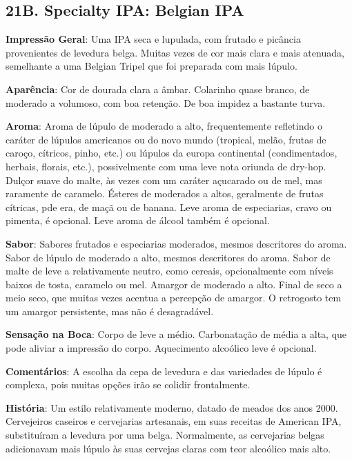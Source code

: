\subsection*{21B. Specialty IPA: Belgian IPA}

\textbf{Impressão Geral}: Uma IPA seca e lupulada, com frutado e picância provenientes de levedura belga. Muitas vezes de cor mais clara e mais atenuada, semelhante a uma Belgian Tripel que foi preparada com mais lúpulo.

\textbf{Aparência}: Cor de dourada clara a âmbar. Colarinho quase branco, de moderado a volumoso, com boa retenção. De boa impidez a bastante turva.

\textbf{Aroma}: Aroma de lúpulo de moderado a alto, frequentemente refletindo o caráter de lúpulos americanos ou do novo mundo (tropical, melão, frutas de caroço, cítricos, pinho, etc.) ou lúpulos da europa continental (condimentados, herbais, florais, etc.), possivelmente com uma leve nota oriunda de dry-hop. Dulçor suave do malte, às vezes com um caráter açucarado ou de mel, mas raramente de caramelo. Ésteres de moderados a altos, geralmente de frutas cítricas, pde era, de maçã ou de banana. Leve aroma de especiarias, cravo ou pimenta, é opcional. Leve aroma de álcool também é opcional.

\textbf{Sabor}: Sabores frutados e especiarias moderados, mesmos descritores do aroma. Sabor de lúpulo de moderado a alto, mesmos descritores do aroma. Sabor de malte de leve a relativamente neutro, como cereais, opcionalmente com níveis baixos de tosta, caramelo ou mel. Amargor de moderado a alto. Final de seco a meio seco, que muitas vezes acentua a percepção de amargor. O retrogosto tem um amargor persistente, mas não é desagradável.

\textbf{Sensação na Boca}: Corpo de leve a médio. Carbonatação de média a alta, que pode aliviar a impressão do corpo. Aquecimento alcoólico leve é opcional.

\textbf{Comentários}: A escolha da cepa de levedura e das variedades de lúpulo é complexa, pois muitas opções irão se colidir frontalmente.

\textbf{História}: Um estilo relativamente moderno, datado de meados dos anos 2000. Cervejeiros caseiros e cervejarias artesanais, em suas receitas de American IPA, substituíram a levedura por uma belga. Normalmente, as cervejarias belgas adicionavam mais lúpulo às suas cervejas claras com teor alcoólico mais alto.

